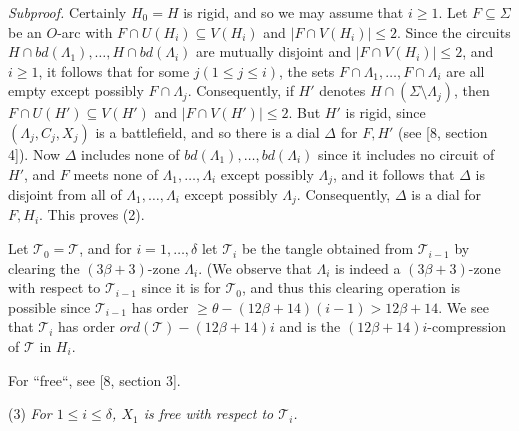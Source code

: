\textit{Subproof.} Certainly $H_0 = H$ is rigid, and so we may assume that $i \ge 1$. Let $F \subseteq \Sigma$ be an $O$-arc with $F \cap U(H_i) \subseteq V(H_i)$ and $|F \cap V(H_i)| \le 2$. Since the circuits $H \cap bd(\Lambda_1), \ldots, H \cap bd(\Lambda_i)$ are mutually disjoint and $|F \cap V(H_i)| \le 2$, and $i \ge 1$, it follows that for some $j (1 \le j \le i)$, the sets $F \cap \Lambda_1, \ldots, F \cap \Lambda_i$ are all empty except possibly $F \cap \Lambda_j$. Consequently, if $H'$ denotes $H \cap (\Sigma \setminus \Lambda_j)$, then $F \cap U(H') \subseteq V(H')$ and $|F \cap V(H')| \le 2$. But $H'$ is rigid, since $(\Lambda_j, C_j, X_j)$ is a battlefield, and so there is a dial $\Delta$ for $F, H'$ (see [8, section 4]). Now $\Delta$ includes none of $bd(\Lambda_1), \ldots, bd(\Lambda_i)$ since it includes no circuit of $H'$, and $F$ meets none of $\Lambda_1, \ldots, \Lambda_i$ except possibly $\Lambda_j$, and it follows that $\Delta$ is disjoint from all of $\Lambda_1, \ldots, \Lambda_i$ except possibly $\Lambda_j$. Consequently, $\Delta$ is a dial for $F, H_i$. This proves (2).

Let $\mathscr{T}_0 = \mathscr{T}$, and for $i = 1, \ldots, \delta$ let $\mathscr{T}_i$ be the tangle obtained from $\mathscr{T}_{i-1}$ by clearing the $(3\beta + 3)$-zone $\Lambda_i$. (We observe that $\Lambda_i$ is indeed a $(3\beta + 3)$-zone with respect to $\mathscr{T}_{i-1}$ since it is for $\mathscr{T}_0$, and thus this clearing operation is possible since $\mathscr{T}_{i-1}$ has order $\ge \theta - (12\beta + 14)(i - 1) > 12\beta + 14$. We see that $\mathscr{T}_i$ has order $ord(\mathscr{T}) - (12\beta + 14)i$ and is the $(12\beta + 14)i$-compression of $\mathscr{T}$ in $H_i$.

For ``free``, see [8, section 3].

\hspace*{12pt}(3) \textit{For $1 \le i \le \delta$, $X_1$ is free with respect to $\mathscr{T}_i$.}
